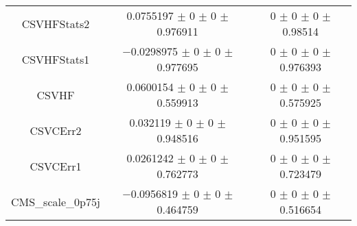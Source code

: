 \begin{table}
\begin{tabular}{ccc}
CSVHFStats2 	& \num{0.0755197} $\pm$ \num{0} $\pm$ \num{0} $\pm$ \num{0.976911} 	& \num{0} $\pm$ \num{0} $\pm$ \num{0} $\pm$ \num{0.98514}\\
CSVHFStats1 	& \num{-0.0298975} $\pm$ \num{0} $\pm$ \num{0} $\pm$ \num{0.977695} 	& \num{0} $\pm$ \num{0} $\pm$ \num{0} $\pm$ \num{0.976393}\\
CSVHF 	& \num{0.0600154} $\pm$ \num{0} $\pm$ \num{0} $\pm$ \num{0.559913} 	& \num{0} $\pm$ \num{0} $\pm$ \num{0} $\pm$ \num{0.575925}\\
CSVCErr2 	& \num{0.032119} $\pm$ \num{0} $\pm$ \num{0} $\pm$ \num{0.948516} 	& \num{0} $\pm$ \num{0} $\pm$ \num{0} $\pm$ \num{0.951595}\\
CSVCErr1 	& \num{0.0261242} $\pm$ \num{0} $\pm$ \num{0} $\pm$ \num{0.762773} 	& \num{0} $\pm$ \num{0} $\pm$ \num{0} $\pm$ \num{0.723479}\\
CMS\_scale\_0p75j 	& \num{-0.0956819} $\pm$ \num{0} $\pm$ \num{0} $\pm$ \num{0.464759} 	& \num{0} $\pm$ \num{0} $\pm$ \num{0} $\pm$ \num{0.516654}\\
\bottomrule
\end{tabular}
\end{table}